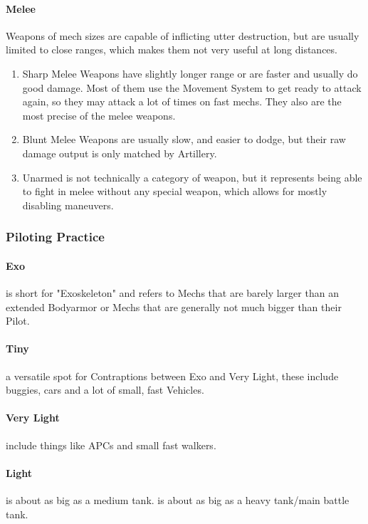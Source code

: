 \documentclass{article}
\begin{document}
        \paragraph{Melee} Weapons of mech sizes \newline are capable of inflicting utter destruction, but are usually
        limited to close ranges, which makes them not very useful at long distances.
        \begin{enumerate}[label= -]
            \item{Sharp} Melee Weapons have slightly longer range or are faster and usually do good damage. Most of them
            use the Movement System to get ready to attack again, so they may attack a lot of times on fast mechs.
            They also are the most precise of the melee weapons.
            \item{Blunt} Melee Weapons are usually slow, and easier to dodge, but their raw damage output is only
            matched by Artillery.
            \item{Unarmed} is not technically a category of weapon, but it represents being able to fight in melee
            without any special weapon, which allows for mostly disabling maneuvers.
        \end{enumerate}
    \subsubsection{Piloting Practice}
        \paragraph{Exo} is short for "Exoskeleton" and refers to Mechs that are barely larger than an extended Bodyarmor
        or Mechs that are generally not much bigger than their Pilot.
        \paragraph{Tiny} a versatile spot for Contraptions between Exo and Very Light, these include buggies, cars and
        a lot of small, fast Vehicles.
        \paragraph{Very Light} include things like APCs and small fast walkers.
        \paragraph{Light} is about as big as a medium tank.
         is about as big as a heavy tank/main battle tank.
\end{document}
